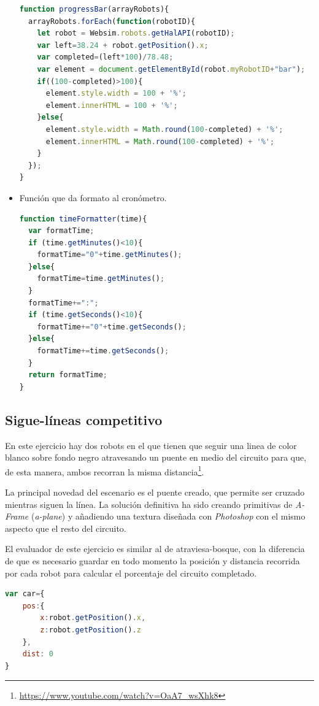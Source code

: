 \begin{itemize}
  \begin{lstlisting}[language=javascript]
function progressBar(arrayRobots){
  arrayRobots.forEach(function(robotID){
    let robot = Websim.robots.getHalAPI(robotID);
    var left=38.24 + robot.getPosition().x;
    var completed=(left*100)/78.48;
    var element = document.getElementById(robot.myRobotID+"bar");
    if((100-completed)>100){
      element.style.width = 100 + '%';
      element.innerHTML = 100 + '%';
    }else{
      element.style.width = Math.round(100-completed) + '%';
      element.innerHTML = Math.round(100-completed) + '%';
    }
  });
}
\end{lstlisting}
        \item Función que da formato al cronómetro.
\begin{lstlisting}[language=javascript]
function timeFormatter(time){
  var formatTime;
  if (time.getMinutes()<10){
    formatTime="0"+time.getMinutes();
  }else{
    formatTime=time.getMinutes();
  }
  formatTime+=":";
  if (time.getSeconds()<10){
    formatTime+="0"+time.getSeconds();
  }else{
    formatTime+=time.getSeconds();
  }
  return formatTime;
}
\end{lstlisting}
\end{itemize}

\subsection{Sigue-líneas competitivo}
\label{subsec:race}

En este ejercicio hay dos robots en el que tienen que seguir una linea de color blanco sobre fondo negro atravesando un puente en medio del circuito para que, de esta manera, ambos recorran la misma distancia\footnote{\url{https://www.youtube.com/watch?v=OaA7_wsXhk8}}.

La principal novedad del escenario es el puente creado, que permite ser cruzado mientras siguen la línea. La solución definitiva ha sido creando primitivas de \textit{A-Frame} (\textit{a-plane}) y añadiendo una textura diseñada con \textit{Photoshop} con el mismo aspecto que el resto del circuito.

El evaluador de este ejercicio es similar al de atraviesa-bosque, con la diferencia de que es necesario guardar en todo momento la posición y distancia recorrida por cada robot para calcular el porcentaje del circuito completado. 
\begin{lstlisting}[language=javascript,caption=Objeto creado para guardar posición y distancia recorrida de un robot]
var car={
    pos:{
        x:robot.getPosition().x,
        z:robot.getPosition().z
    },
    dist: 0
}
\end{lstlisting}

